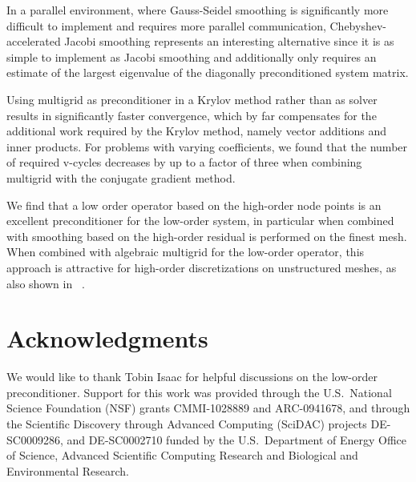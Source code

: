 \documentclass[smallcondensed,final]{svjour3}     %
\newcommand{\todo}[1]{\textcolor{red}{ #1}}
\begin{document}
In a parallel environment, where Gauss-Seidel smoothing is
significantly more difficult to implement and requires more parallel
communication, Chebyshev-accelerated Jacobi smoothing represents an
interesting alternative since it is as simple to implement as Jacobi
smoothing and additionally only requires an estimate of the largest
eigenvalue of the diagonally preconditioned system matrix.

Using multigrid as preconditioner in a Krylov method rather than as
solver results in significantly faster convergence, which by far
compensates for the additional work required by the Krylov method,
namely vector additions and inner products.  For problems with varying
coefficients, we found that the number of required v-cycles decreases
by up to a factor of three when combining multigrid with the conjugate
gradient method.

We find that a low order operator based on the high-order node points
is an excellent preconditioner for the low-order system, in particular
when combined with smoothing based on the high-order residual is
performed on the finest mesh.  When combined with algebraic multigrid
for the low-order operator, this approach is attractive for high-order
discretizations on unstructured meshes, as also shown in
~\cite{Brown10, DevilleMund90, HeysManteuffelMcCormickEtAl05}.



\section*{Acknowledgments}
We would like to thank Tobin Isaac for helpful discussions on the
low-order preconditioner. Support for this work was
  provided through the U.S.~National Science Foundation (NSF) grants
  CMMI-1028889 and   %
  ARC-0941678,       %
 and through the Scientific Discovery through Advanced
  Computing (SciDAC) projects 
  DE-SC0009286,   %
  and DE-SC0002710 %
  funded by the U.S.~Department of Energy
  Office of Science, Advanced Scientific Computing Research and
  Biological and Environmental Research.




\end{document}
